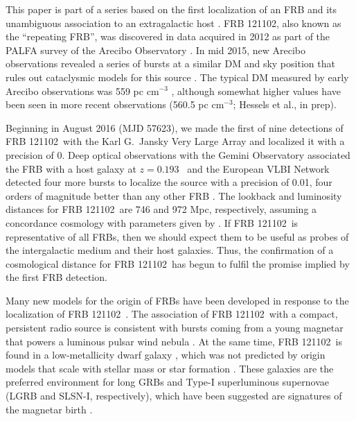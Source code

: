 \documentclass[twocolumn]{aastex61}
\newcommand{\frb}{FRB 121102}
\begin{document}
This paper is part of a series based on the first localization of an FRB and its unambiguous association to an extragalactic host \citep{LOC, OPT, EVN}. \frb, also known as the ``repeating FRB'', was discovered \citep{2014ApJ...790..101S} in data acquired in 2012 as part of the PALFA survey of the Arecibo Observatory \citep{2006ApJ...637..446C}. In mid 2015, new Arecibo observations revealed a series of bursts at a similar DM and sky position that rules out cataclysmic models for this source \citep{2016Natur.531..202S}. The typical DM measured by early Arecibo observations was 559 pc cm$^{-3}$ \citep{2016arXiv160308880S}, although somewhat higher values have been seen in more recent observations (560.5 pc cm$^{-3}$; Hessels et al., in prep).

Beginning in August 2016 (MJD 57623), we made the first of nine detections of \frb\ with the Karl G.\ Jansky Very Large Array \citep[VLA;][]{LOC} and localized it with a precision of 0. Deep optical observations with the Gemini Observatory associated the FRB with a host galaxy at $z=0.193$\ \citep{OPT} and the European VLBI Network detected four more bursts to localize the source with a precision of 0.01\arcsec, four orders of magnitude better than any other FRB \citep[precision of $\sim40$\ pc in linear distance;][]{EVN}. The lookback and luminosity distances for \frb\ are 746 and 972 Mpc, respectively, assuming a concordance cosmology with parameters given by \citet{2016A&A...594A..13P}. If \frb\ is representative of all FRBs, then we should expect them to be useful as probes of the intergalactic medium and their host galaxies. Thus, the confirmation of a cosmological distance for \frb\ has begun to fulfil the promise implied by the first FRB detection.

Many new models for the origin of FRBs have been developed in response to the localization of \frb\ \citep{2017arXiv170104815K, 2017arXiv170102370M, 2017arXiv170104094Z, 2017arXiv170102492D, 2017arXiv170208644B, 2017arXiv170300393T}. The association of \frb\ with a compact, persistent radio source is consistent with bursts coming from a young magnetar that powers a luminous pulsar wind nebula \citep{2017arXiv170104815K}. At the same time, \frb\ is found in a low-metallicity dwarf galaxy \citep{OPT}, which was not predicted by origin models that scale with stellar mass or star formation \citep{2017arXiv170400022N}. These galaxies are the preferred environment for long GRBs and Type-I superluminous supernovae (LGRB and SLSN-I, respectively), which have been suggested are signatures of the magnetar birth \citep{2008AJ....135.1136M, 2014ApJ...787..138L}.
\end{document}

